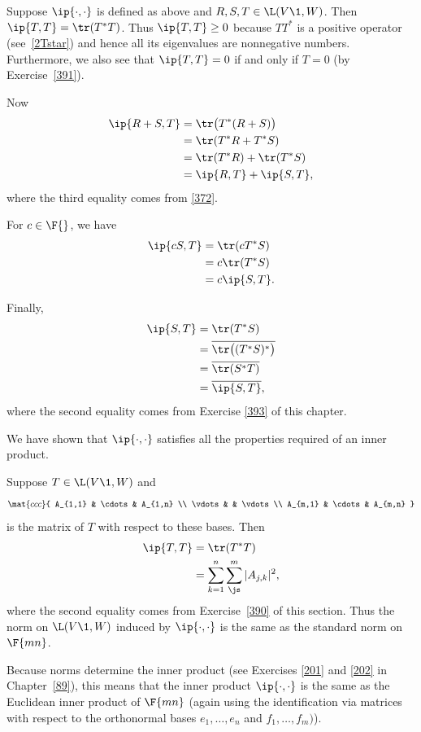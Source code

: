 \begin{Solution}
\begin{subtheorem}
\item
Suppose $\ip{\cdot, \cdot}$ is defined as above and $R, S, T \in \L(V\1, W)$.  Then
$\ip{T, T} = \tr(T^*T)$. Thus
$\ip{T,T} \ge 0$ because $TT^*$ is a positive operator (see~\ref{2Tstar}) and hence all its eigenvalues are nonnegative numbers. Furthermore, we also see that $\ip{T, T} = 0$ if and only if $T = 0$ (by Exercise~\ref{391}).

Now
\begin{align*}
\ip{R + S, T} &= \tr\bigl(T^*(R+S)\bigr) \\
&= \tr(T^*R + T^*S) \\
&= \tr(T^*R) + \tr(T^*S) \\
&= \ip{R, T} + \ip{S,T},
\end{align*}
where the third equality comes from \ref{372}.

For $c \in \F{}$, we have
\begin{align*}
\ip{cS, T} &= \tr(cT^*S) \\
&= c \tr(T^*S) \\
&= c \ip{S, T}.
\end{align*}

Finally,
\begin{align*}
\ip{S,T} &= \tr(T^*S) \\
&= \overline{\tr\bigl( (T^*S)^* \bigr)} \\
&= \overline{\tr(S^*T)} \\
&= \overline{\ip{S, T}},
\end{align*}
where the second equality comes from Exercise \ref{393} of this chapter.

We have shown that $\ip{\cdot,\cdot}$ satisfies all the properties required of an
inner product.

\item
Suppose $T \in \L(V\1, W)$ and
\[
\mat{ccc}{
A_{1,1} & \cdots & A_{1,n} \\
\vdots &   & \vdots \\
A_{m,1} & \cdots & A_{m,n} }
\]
is the matrix of $T$ with respect to these bases.  Then
\begin{align*}
\ip{T, T} &= \tr(T^*T) \\
&= \sum_{k=1}^n \sum_{\js}^m |A_{j,k}|^2,
\end{align*}
where the second equality comes from
Exercise~\ref{390} of this section.  Thus the norm on $\L(V\1, W)$ induced by
$\ip{\cdot, \cdot}$ is the same as the standard norm on $\F{mn}$.

Because norms determine the inner product (see Exercises \ref{201} and \ref{202} in
Chapter~\ref{89}), this means that the inner product $\ip{\cdot, \cdot}$ is the
same as the Euclidean inner product of $\F{mn}$ (again using the identification
via matrices with respect to the orthonormal bases $e_1, \dots, e_n$ and $f_1, \ldots, f_m)$).
\end{subtheorem}
\end{Solution}

